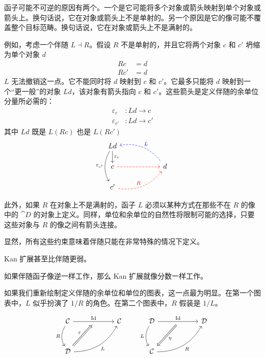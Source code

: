 \documentclass[DaoFP]{subfiles}
\begin{document}
函子可能不可逆的原因有两个。一个是它可能将多个对象或箭头映射到单个对象或箭头上。换句话说，它在对象或箭头上不是单射的。另一个原因是它的像可能不覆盖整个目标范畴。换句话说，它在对象或箭头上不是满射的。

例如，考虑一个伴随 $L \dashv R$。假设 $R$ 不是单射的，并且它将两个对象 $c$ 和 $c'$ 坍缩为单个对象 $d$
\begin{align*}
R c &= d \\
R c' &= d
\end{align*}
$L$ 无法撤销这一点。它不能同时将 $d$ 映射到 $c$ 和 $c'$。它最多只能将 $d$ 映射到一个“更一般”的对象 $L d$，该对象有箭头指向 $c$ 和 $c'$。这些箭头是定义伴随的余单位分量所必需的：
\begin{align*}
\varepsilon_c &\colon L d \to c
\\
\varepsilon_{c'} &\colon L d \to c'
\end{align*}
其中 $L d$ 既是 $L (R c)$ 也是 $L (R c')$
\[
 \begin{tikzcd} [row sep=0.5cm, column sep=1cm]
 L d
 \arrow[d, "\varepsilon_c"]
 \arrow[dd, bend right, "\varepsilon_{c'}"']
 \\
 c
 \arrow[rr, red, dashed, ""]
 && d
 \arrow[ull, blue, bend right, dashed, "L"']
 \\
 c'
 \arrow[urr, red, bend right, dashed, "R"]
  \end{tikzcd}
\]

此外，如果 $R$ 在对象上不是满射的，函子 $L$ 必须以某种方式在那些不在 $R$ 的像中的 $\cat D$ 的对象上定义。同样，单位和余单位的自然性将限制可能的选择，只要这些对象与 $R$ 的像之间有箭头连接。

显然，所有这些约束意味着伴随只能在非常特殊的情况下定义。

Kan 扩展甚至比伴随更弱。

如果伴随函子像逆一样工作，那么 Kan 扩展就像分数一样工作。

如果我们重新绘制定义伴随的余单位和单位的图表，这一点最为明显。在第一个图表中，$L$ 似乎扮演了 $1/R$ 的角色。在第二个图表中，$R$ 假装是 $1/L$。

\[
 \begin{tikzcd} [row sep=1cm, column sep=1cm]
 \cat C
 \arrow[rr, "\text{Id}", "" {name=ID, below} ]
 \arrow[d, bend right, "R"']
 && \cat C
 \\
 \cat D
  \arrow[urr, bend right, "L"']
 \arrow[Rightarrow, "\varepsilon",  to=ID]
 \end{tikzcd}
 \qquad
 \begin{tikzcd} [row sep=1cm, column sep=1cm]
 \cat D
 \arrow[rr, "\text{Id}", "" {name=ID, below} ]
 \arrow[d, bend right, "L"']
 && \cat D
 \\
 \cat C
  \arrow[urr, bend right, "R"']
 \arrow[Rightarrow, "\eta",  from=ID]
 \end{tikzcd}
\]
\end{document}

